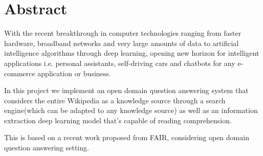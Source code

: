 \chapter*{Abstract}
\label{chap:general_intorduction}
%
%
With the recent breakthrough in computer technologies ranging from faster hardware, broadband networks and very large amounts of data to artificial intelligence algorithms through deep learning, opening new horizon for intelligent applications i.e. personal assistants, self-driving cars and chatbots for any e-commerce application or business.

In this project we implement an open domain question answering system that considers the entire Wikipedia as a knowledge source through a search engine(which can be adapted to any knowledge source) as well as an information extraction deep learning model that's capable of reading comprehension.

This is based on a recent work \cite{P17-1171} proposed from \Ac{FAIR}, considering open domain question answering setting.
